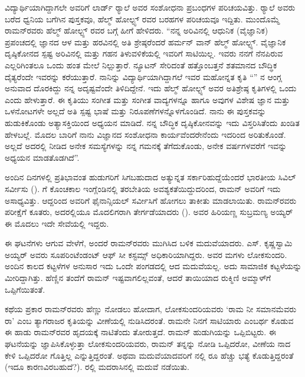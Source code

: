 ವಿದ್ಯಾರ್ಥಿಯಾಗಿದ್ದಾಗಲೇ ಅವರಿಗೆ ಲಾರ್ಡ್ ರ‍್ಯಾಲೆ ಅವರ ಸಂಶೋಧನಾ ಪ್ರಬಂಧಗಳ ಪರಿಚಯವಿತ್ತು. ರ‍್ಯಾಲೆ ಅವರು ಬರೆದ ಧ್ವನಿಯ ಬಗೆಗಿನ ಪುಸ್ತಕವೂ, ಹೆಲ್ಮ್ ‍ಹೋಲ್ಟ್ಸ್ ರವರ ಬರಹಗಳ ಪರಿಚಯವೂ ಇದ್ದಿತು. ಮುಂದೊಮ್ಮೆ ರಾಮನ್‍ರವರು ಹೆಲ್ಮ್ ‍ಹೋಲ್ಟ್ಸ್ ರವರ ಬಗ್ಗೆ ಹೀಗೆ ಹೇಳಿದರು. “ನನ್ನ ಅರಿವಿನಲ್ಲಿ ಆಧುನಿಕ (ವೈಜ್ಞಾನಿಕ) ಪ್ರಪಂಚದಲ್ಲಿ ಜ್ಞಾನದ ಆಳ ಮತ್ತು ಹರವಿನಲ್ಲಿ ಅತಿ ಶ್ರೇಷ್ಠರೆಂದರೆ ಹರ್ಮನ್ ವಾನ್ ಹೆಲ್ಮ್ ‍ಹೋಲ್ಟ್ಸ್. ವೈಜ್ಞಾನಿಕ ದೃಷ್ಠಿಕೋನದ ಸ್ಪಷ್ಟ ಅರಿವಿನಲ್ಲಿ ಮತ್ತು ಗಹನ ತಿಳುವಳಿಕೆಯಲ್ಲಿ ಇವರಿಗೆ ಸಾಟಿಯಿಲ್ಲ. ಇವರು ನನಗೆ ನೆನಪಿರುವ ಎಲ್ಲರಿಗಿಂತಲೂ ಒಂದು ಹಂತ ಮೇಲೆ ನಿಲ್ಲುತ್ತಾರೆ. ನ್ಯೂಟನ್ ಸೇರಿದಂತೆ ಹತ್ತೊಂಬತ್ತನೆ ಶತಮಾನದ ಬೌದ್ಧಿಕ ದೈತ್ಯರೆಂದೇ ಇವರನ್ನು ಕರೆಯುತ್ತಾರೆ. ನಾನಿನ್ನು ವಿದ್ಯಾರ್ಥಿಯಾಗಿದ್ದಾಗಲೆ ಇವರ ಮಹೋನ್ನತ ಕೃತಿ “” ನ ಆಂಗ್ಲ ಅನುವಾದ ದೊರಕಿದ್ದು ನನ್ನ ಅದೃಷ್ಟವೆಂದೇ ತಿಳಿದಿದ್ದೇನೆ. ಇದು ಹೆಲ್ಮ್ ‍ಹೋಲ್ಟ್ಸ್ ಅವರ ಅತಿಶ್ರೇಷ್ಠ ಕೃತಿಗಳಲ್ಲಿ ಒಂದು ಎಂದು ಹೇಳುತ್ತಾರೆ. ಈ ಕೃತಿಯು ಸಂಗೀತ ಮತ್ತು ಸಂಗೀತ ವಾದ್ಯಗಳನ್ನೂ ಹಾಗೂ ಅವುಗಳ ವಿಶೇಷ ಜ್ಞಾನ ಮತ್ತು ಒಳನೋಟಗಳೇ ಅಲ್ಲದೆ ಅತಿ ಸ್ಪಷ್ಟ ಭಾಷೆ ಮತ್ತು ನಿರೂಪಣೆಗಳನ್ನೊಳಗೊಂಡಿದೆ. ನಾನು ಈ ಪುಸ್ತಕವನ್ನು ಹುಡುಕಿಕೊಂಡು ಅತ್ಯಾಸಕ್ತಿಯಿಂದ ಅಧ್ಯಯನ ಮಾಡಿದೆ. ನನ್ನ ಬೌದ್ಧಿಕ ದೃಷ್ಠಿಕೋನವನ್ನು ಇದು ವಿಸ್ತರಿಸಿತೆಂದು ಖಂಡಿತ ಹೇಳಬಲ್ಲೆ. ಮೊದಲ ಬಾರಿಗೆ ನಾನು ವಿಜ್ಞಾನದ ಸಂಶೋಧನಾ ಕಾರ್ಯವೆಂದರೇನೆಂದು ಇದರಿಂದ ಅರಿತುಕೊಂಡೆ. ಅಲ್ಲದೆ ಅದರಲ್ಲಿ ನೀಡಿದ ಅನೇಕ ಸಮಸ್ಯೆಗಳನ್ನು ನನ್ನ ಗಮನಕ್ಕೆ ತೆಗೆದುಕೊಂಡು, ಅನೇಕ ವರ್ಷಗಳವರೆಗೆ ಇವನ್ನು ಅಧ್ಯಯನ ಮಾಡತೊಡಗಿದೆ”.



ಅಂದಿನ ದಿನಗಳಲ್ಲಿ ಪ್ರತಿಭಾವಂತ ಹುಡುಗರಿಗೆ ಸಿಗಬಹುದಾದ ಅತ್ಯುನ್ನತ ಸರ್ಕಾರಿ\break ಹುದ್ದೆಯೆಂದರೆ ಭಾರತೀಯ ಸಿವಿಲ್ ಸರ್ವೀಸು ().  ಗೆ ಕೊಂಚಕಾಲ ಇಂಗ್ಲೆಂಡಿನಲ್ಲಿ ತರಬೇತಿಯ ಅವಶ್ಯಕತೆಯಿದ್ದುದರಿಂದ, ರಾಮನ್ ಅವರಿಗೆ ಇದು ಅಸಾಧ್ಯವಿತ್ತು. ಆದ್ದರಿಂದ ಅವರಿಗೆ ಫೈನಾನ್ಸಿಯಲ್ ಸರ್ವೀಸಿಗೆ  ಹೋಗಲು ತಾಕೀತು ಮಾಡಲಾಯಿತು. ರಾಮನ್‍ರವರು  ಪರೀಕ್ಷೆಗೆ ಕೂತರು, ಅದರಲ್ಲಿಯೂ ಮೊದಲಿಗರಾಗಿ ತೇರ್ಗಡೆಯಾದರು (). ಅವರ ಹಿರಿಯಣ್ಣ ಸುಬ್ರಮಣ್ಯ ಅಯ್ಯರ್ ಈ ಮೊದಲು ಇದೇ ಸೇವೆಯಲ್ಲಿ ಇದ್ದರು.

ಈ ಘಟನೆಗಳು ಆಗುವ ವೇಳೆಗೆ, ಅಂದರೆ ರಾಮನ್‍ರವರು  ಮುಗಿಸಿದ ಬಳಿಕ ಮದುವೆಯಾದರು. ಎಸ್. ಕೃಷ್ಣಸ್ವಾಮಿ ಅಯ್ಯರ್ ಅವರು ಸೂಪರಿಂಟೆಂಡಂಟ್ ಆಫ್ ಸೀ ಕಸ್ಟಮ್ಸ್ ಅಧಿಕಾರಿಯಾಗಿದ್ದರು. ಅವರ ಮಗಳು ಲೋಕಸುಂದರಿ. ಅಂದಿನ ಕಾಲದ ಕಟ್ಟಳೆಗಳ ಅನುಸಾರ ಇದು ಒಂದೇ ಪಂಗಡದಲ್ಲಿ ಆದ ಮದುವೆಯಲ್ಲ. ಅದು ಸಾಮಾಜಿಕ ಕಟ್ಟಳೆಯನ್ನು ಮೀರಿದ್ದಾಗಿತ್ತು. ಹೆಣ್ಣಿನ ತಂದೆಗೆ ರಾಮನ್ ಇಷ್ಟವಾಗಲಿಲ್ಲವಂತೆ, ಆದರೆ ತಾಯಿಯಾದ ರುಕ್ಮಿಣಿ ಅಮ್ಮಾಳ್‍ಗೆ ಒಪ್ಪಿಗೆಯಿತಂತೆ.

ಕಥೆಯ ಪ್ರಕಾರ ರಾಮನ್‍ರವರು ಹೆಣ್ಣು ನೋಡಲು ಹೋದಾಗ, ಲೋಕಸುಂದರಿಯವರು ‘ರಾಮ ನೀ ಸಮಾನಮೆವರು ರಾ’ ಎಂಬ ತ್ಯಾಗರಾಜರ ಕೃತಿಯನ್ನು ವೀಣೆಯಲ್ಲಿ ನುಡಿಸಿದರಂತೆ. ರಾಮನೇ ನಿನಗೆ ಸಾಟಿಯಾರು ಎಂಬರ್ಥ ಕೊಡುವ ಈ ಹಾಡು ರಾಮನ್‍ರವರ ಹೃದಯಕ್ಕೆ ನಾಟಿತೆಂದು ತೋರುತ್ತದೆ. ರಾಮನ್ ಹುಡುಗಿಯನ್ನು ಒಪ್ಪಿಬಿಟ್ಟರು. ಈ ಘಟನೆಯನ್ನು ಜ್ಞಾಪಿಸಿಕೊಳ್ಳುತ್ತಾ ಲೋಕಸುಂದರಿಯವರು, ರಾಮನ್ ತನ್ನನ್ನು ನೋಡಿ ಒಪ್ಪಿದರೋ, ವೀಣೆಯ ನಾದ ಕೇಳಿ ಒಪ್ಪಿದರೋ ಗೊತ್ತಿಲ್ಲ ಎನ್ನುತ್ತಿದ್ದರಂತೆ. ಅಥವಾ ಮದುವೆಯಾದವರಿಗೆ  ನಲ್ಲಿ ರೂ  ಹೆಚ್ಚು ಭತ್ಯೆ ಕೊಡುತ್ತಿದ್ದರಂತೆ (ಇದೂ ಕಾರಣವಿರಬಹುದೆ?). ರಲ್ಲಿ ಮದರಾಸಿನಲ್ಲಿ ಮದುವೆ ನಡೆಯಿತು.

